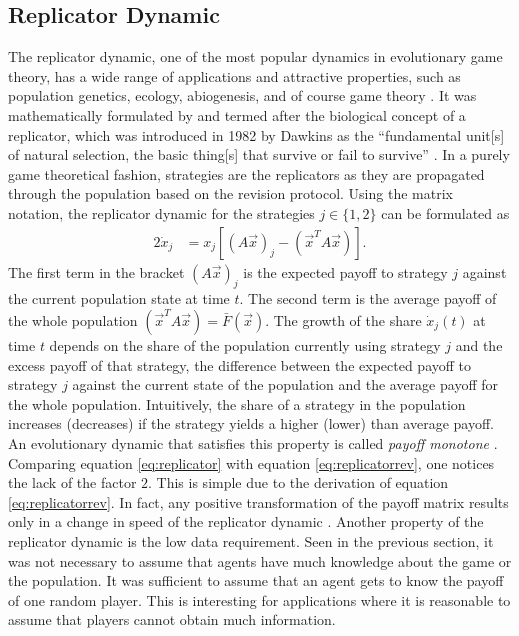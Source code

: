\subsection{Replicator Dynamic}
\label{sec:replicatordynamic}
The replicator dynamic, one of the most popular dynamics in 
evolutionary game theory, has a wide range of applications and 
attractive properties, such as population genetics, ecology, abiogenesis, and
of course game theory \parencite[203]{hofbauer_evolutionary_1998}. 
It was mathematically formulated by \textcite{taylor_evolutionary_1978} and 
termed after the biological concept of a replicator, which was 
introduced in 1982 by Dawkins as the ``fundamental unit[s] of natural selection,
the basic thing[s] that survive or fail to survive''
\parencite[254]{dawkins_selfish_2016}. In a purely game theoretical fashion,
strategies are the replicators as they are propagated through the population
based on the revision protocol. Using the matrix notation, 
the replicator dynamic  
for the strategies $j \in \{1,2\}$ can be formulated as 
\begin{alignat}{2}
        \dot{x}_j &= x_j\left[\left(A\vec{x}\right)_j -
        \left(\vec{x}^T A \vec{x}\right)\right]. 
        \label{eq:replicator}
\end{alignat}
The first term in the bracket $(A\vec{x})_j$ is the expected payoff to 
strategy $j$ against the current population state at time $t$. The second
term is the average payoff of the whole population 
$(\vec{x}^T A \vec{x}) =\bar{F}(\vec{x})$.
The growth of the share $\dot{x}_j(t)$ at time $t$ depends 
on the share of the population currently using strategy $j$ and the 
excess payoff of that strategy, the difference between the expected 
payoff to strategy $j$ against the current state of the population and the
average payoff for the whole population.
Intuitively, the share of a strategy in the population increases (decreases) 
if the strategy yields a higher (lower) than average payoff. 
An evolutionary dynamic that satisfies this property is called 
\textit{payoff monotone} \parencite[30]{szabo_evolutionary_2007}. 
Comparing equation \eqref{eq:replicator} with equation 
\eqref{eq:replicatorrev}, one notices the lack of the factor $2$. 
This is simple due to the derivation of equation \eqref{eq:replicatorrev}.
In fact, any positive transformation of the payoff matrix 
results only in a change in speed of the replicator dynamic
\parencite[73]{weibull_evolutionary_1997}.
Another property of the replicator dynamic is the low data requirement.
Seen in the previous section, it was not 
necessary to assume that agents have much knowledge about the game or
the population. It was sufficient to assume that an agent gets to know the 
payoff of one random player. This is interesting for applications where it
is reasonable to assume that players cannot obtain much information.

